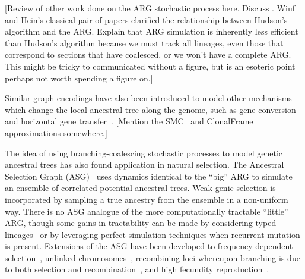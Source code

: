 \documentclass{article}
\begin{document}
[Review of other work done on the ARG stochastic process here.
Discuss \citet{wiuf1999ancestry}. Wiuf and Hein's classical pair of papers
clarified the relationship between Hudson's algorithm and the ARG.
Explain that ARG simulation is inherently less efficient than Hudson's
algorithm because we must track all lineages, even those that correspond
to sections that have coalesced, or we won't have a complete ARG.
This might be tricky to communicated without a figure, but is an
esoteric point perhaps not worth spending a figure on.]

Similar graph encodings have also been introduced to model other mechanisms
which change the local ancestral tree along the genome, such as gene
conversion~\citep{wiuf2000coalescent} and
horizontal gene transfer~\citep{baumdicker2014infinitely}.
[Mention the
SMC~\citep{mcvean2005approximating,marjoram2006fast}
and ClonalFrame~\citep{didelot2007inference} approximations somewhere.]

The idea of using branching-coalescing stochastic processes
to model genetic ancestral trees has also found application in natural selection.
The Ancestral Selection Graph (ASG)~\citep{krone1997ancestral,neuhauser1997genealogy}
uses dynamics identical to the ``big'' ARG to simulate an ensemble of correlated
potential ancestral trees. Weak genic selection is incorporated by sampling a
true ancestry from the ensemble in a non-uniform way.
There is no ASG analogue of the more computationally tractable ``little'' ARG,
though some gains in tractability can be made by considering typed
lineages~\citep{etheridge2009coalescent} or by leveraging perfect simulation
techniques when recurrent mutation is present\citep{fearnhead2001perfect}.
Extensions of the ASG have been developed to frequency-dependent
selection~\citep{neuhauser1999ancestral, gonzalezcasanova2018duality},
unlinked chromosomes~\citep{fearnhead2003ancestral}, recombining
loci whereupon branching is due to both selection and
recombination~\citep{donnelly1999genealogical}, and high fecundity
reproduction~\citep{gonzalezcasanova2018duality, koskela2019robust}.
\end{document}
